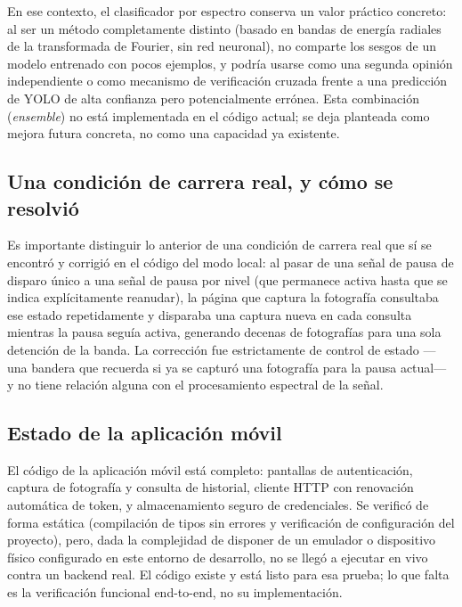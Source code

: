 En ese contexto, el clasificador por espectro conserva un valor
práctico concreto: al ser un método completamente distinto (basado en
bandas de energía radiales de la transformada de Fourier, sin red
neuronal), no comparte los sesgos de un modelo entrenado con pocos
ejemplos, y podría usarse como una segunda opinión independiente o como
mecanismo de verificación cruzada frente a una predicción de YOLO de
alta confianza pero potencialmente errónea. Esta combinación
(\textit{ensemble}) no está implementada en el código actual; se deja
planteada como mejora futura concreta, no como una capacidad ya
existente.

\subsection{Una condición de carrera real, y cómo se resolvió}

Es importante distinguir lo anterior de una condición de carrera real
que sí se encontró y corrigió en el código del modo local: al pasar de
una señal de pausa de disparo único a una señal de pausa por nivel
(que permanece activa hasta que se indica explícitamente reanudar), la
página que captura la fotografía consultaba ese estado repetidamente y
disparaba una captura nueva en cada consulta mientras la pausa seguía
activa, generando decenas de fotografías para una sola detención de la
banda. La corrección fue estrictamente de control de estado —una
bandera que recuerda si ya se capturó una fotografía para la pausa
actual— y no tiene relación alguna con el procesamiento espectral de
la señal.

\subsection{Estado de la aplicación móvil}

El código de la aplicación móvil está completo: pantallas de
autenticación, captura de fotografía y consulta de historial, cliente
HTTP con renovación automática de token, y almacenamiento seguro de
credenciales. Se verificó de forma estática (compilación de tipos sin
errores y verificación de configuración del proyecto), pero, dada la
complejidad de disponer de un emulador o dispositivo físico configurado
en este entorno de desarrollo, no se llegó a ejecutar en vivo contra un
backend real. El código existe y está listo para esa prueba; lo que
falta es la verificación funcional end-to-end, no su implementación.
